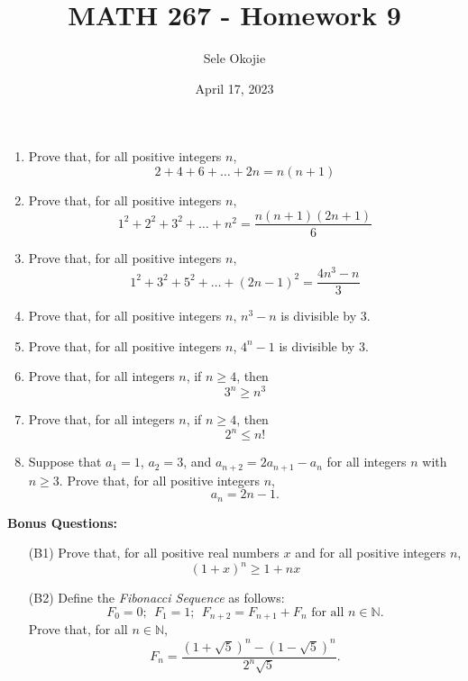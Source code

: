 \documentclass{article}
\title{MATH 267 - Homework 9}
\author{Sele Okojie}
\date{April 17, 2023}
\begin{document}
    \maketitle
    
    \begin{enumerate}

    	\item Prove that, for all positive integers $n$,
    		\[
    			2 + 4 + 6 + \dots + 2n = n(n+1)
    		\]

    	\item Prove that, for all positive integers $n$,
    		\[
    			1^2 + 2^2 + 3^2 + \dots + n^2 = \frac{n(n+1)(2n+1)}{6}
    		\]

    	\item Prove that, for all positive integers $n$,
    		\[
    			1^2 + 3^2 + 5^2 + \dots + (2n-1)^2 = \frac{4n^3-n}{3}
    		\]

    	\item Prove that, for all positive integers $n$, $n^3 - n$ is divisible by $3$.

    	\item Prove that, for all positive integers $n$, $4^n - 1$ is divisible by $3$.

    	\item Prove that, for all integers $n$, if $n \ge 4$, then
    		\[
    			3^n \ge n^3
    		\]

    	\item Prove that, for all integers $n$, if $n \ge 4$, then
    		\[
    			2^n \le n!
    		\]

    	\item Suppose that $a_1 = 1$, $a_2 = 3$, and $a_{n+2} = 2a_{n+1} - a_n$ for all integers $n$ with $n \ge 3$.  Prove that, for all positive integers $n$,
    		\[
    			a_n = 2n - 1.
    		\]
    \end{enumerate}
    
    \newpage
    \textbf{Bonus Questions:}
    
    \begin{itemize}

    	\item [(B1)] Prove that, for all positive real numbers $x$ and for all positive integers $n$,
    		\[
    			\left( 1 + x \right)^n \ge 1 + nx
    		\]

    	\item [(B2)] Define the \emph{Fibonacci Sequence} as follows:
    		\[
    			F_0 = 0; \ \ F_1 = 1; \ \ F_{n+2} = F_{n+1} + F_n \text{ for all } n \in \mathbb{N}.
    		\]
    		Prove that, for all $n \in \mathbb{N}$,
    		\[
    			F_n = \frac{ \left( 1+\sqrt{5} \right)^n - \left( 1-\sqrt{5} \right)^n }{ 2^n \sqrt{5} }.
    		\]
    \end{itemize}
\end{document}
